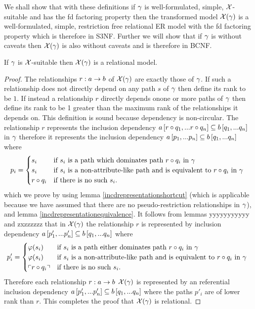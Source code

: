 We shall show that with these definitions if $\gamma$ is well-formulated, simple, $\mathcal{X}$-suitable and has the fd factoring property 
then the transformed model $\mathcal{X}(\gamma)$ is a well-formulated, simple, restriction free relational ER model with the fd factoring property which is therefore in S3NF.  Further we will show that if $\gamma$ is without caveats then $\mathcal{X}(\gamma)$ is also without caveats and is therefore in BCNF. 

\begin{lemma}
If $\gamma$ is $\mathcal{X}$-suitable then $\mathcal{X}(\gamma)$ is a relational model.
\end{lemma}
\begin{proof}
The relationships $r: a \rightarrow b$ of $\mathcal{X}(\gamma)$ are exactly those of $\gamma$. If such a relationship does not directly depend on any path $s$ of $\gamma$ then define its rank to be $1$.
If instead a relationship $r$ directly depends onone or more paths of $\gamma$ then define its rank to be 1 greater than the maximum rank of the relationships it depends on. 
This definition is sound because dependency is non-circular.
The relationship $r$ represents the inclusion dependency $a\left[r \circ q_1,...r \circ q_n\right]\subseteq b\left[q_1,...q_n\right]$ in $\gamma$ therefore it represents
the inclusion dependency $a\left[p_1,...p_n\right]\subseteq b\left[q_1,...q_n\right]$ where 
$$
p_i =
\begin{cases} 
    s_i         & \mbox{if $s_i$ is a path which dominates path $r \circ q_i$ in $\gamma$} \\
    s_i         & \mbox{if $s_i$ is a non-attribute-like path and is equivalent to  $r \circ q_i$ in $\gamma$ }  \\
    r \circ q_i & \mbox{if there is no such $s_i$.}
\end{cases} 
$$
which we prove by using lemma \ref{incdrepresentationshortcut} (which is applicable because we have assumed 
that there are no pseudo-restriction relationships in $\gamma$), and lemma \ref{incdrepresentationequivalence}.
It follows from lemmas yyyyyyyyyyy  and zxzzzzzz that in $\mathcal{X}(\gamma)$ the relationship $r$ is represented by inclusion dependency $a\left[p'_1,...p'_n\right]\subseteq b\left[q_1,...q_n\right]$ where
$$
p'_i =
\begin{cases}
   \varphi(s_i)     & \mbox{if $s_i$ is a path  either dominates path $r \circ q_i$ in $\gamma$} \\
   \varphi(s_i)     & \mbox{if $s_i$ is a non-attribute-like path and is equivalent to  $r \circ q_i$ in $\gamma$ }  \\
   \left\ulcorner r \circ q_i\right\urcorner  & \mbox{if there is no such $s_i$.}
\end{cases} 
$$
Therefore each relationship $r: a \rightarrow b$ $\mathcal{X}(\gamma)$ is represented by an referential inclusion dependency $a\left[p'_1,...p'_n\right]\subseteq b\left[q_1,...q_n\right]$
where the paths $p'_i$ are of lower rank than $r$. This completes the proof that $\mathcal{X}(\gamma)$ is relational.
\end{proof}


